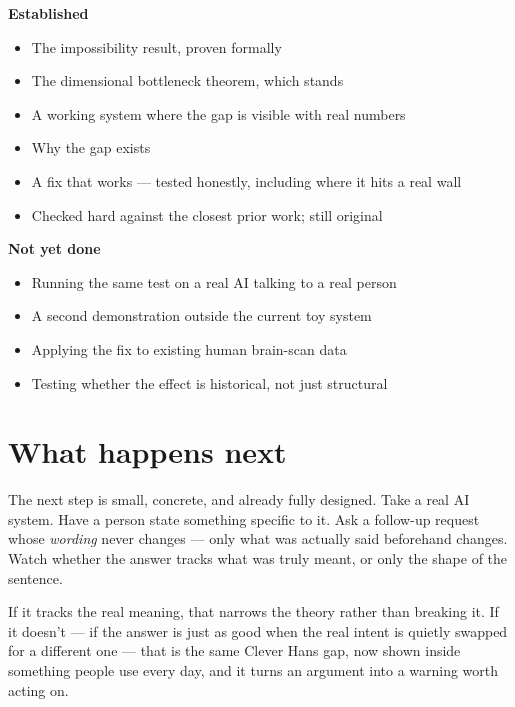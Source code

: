 \documentclass[11pt]{article}
\begin{document}
\begin{minipage}[t]{0.48\textwidth}
\begin{provenbox}
\textbf{Established}
\begin{itemize}[leftmargin=*, itemsep=2pt, topsep=2pt]
  \item The impossibility result, proven formally
  \item The dimensional bottleneck theorem, which stands
  \item A working system where the gap is visible with real numbers
  \item Why the gap exists
  \item A fix that works --- tested honestly, including where it hits a real wall
  \item Checked hard against the closest prior work; still original
\end{itemize}
\end{provenbox}
\end{minipage}
\hfill
\begin{minipage}[t]{0.48\textwidth}
\begin{opennbox}
\textbf{Not yet done}
\begin{itemize}[leftmargin=*, itemsep=2pt, topsep=2pt]
  \item Running the same test on a real AI talking to a real person
  \item A second demonstration outside the current toy system
  \item Applying the fix to existing human brain-scan data
  \item Testing whether the effect is historical, not just structural
\end{itemize}
\end{opennbox}
\end{minipage}

\section{What happens next}

The next step is small, concrete, and already fully designed. Take a real AI system. Have a person state something specific to it. Ask a follow-up request whose \emph{wording} never changes --- only what was actually said beforehand changes. Watch whether the answer tracks what was truly meant, or only the shape of the sentence.

If it tracks the real meaning, that narrows the theory rather than breaking it. If it doesn't --- if the answer is just as good when the real intent is quietly swapped for a different one --- that is the same Clever Hans gap, now shown inside something people use every day, and it turns an argument into a warning worth acting on.
\end{document}
